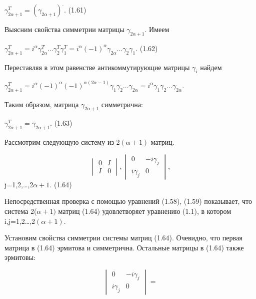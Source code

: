 \documentclass{article}
\begin{document}
{\begin{center}
$\gamma^{T}_{2\alpha+1}=(\gamma_{2\alpha+1})^{.}.$ (1.61)\par
\end{center}
Выясним свойства симметрии матрицы $\gamma_{2\alpha+1}$. Имеем\par
\begin{center}
$\gamma^{T}_{2\alpha+1}=i^{\alpha}\gamma^{T}_{2\alpha}\dots\gamma^{T}_2\gamma^{T}_1=i^{\alpha}(-1)^{\alpha}\gamma_{2\alpha}\dots\gamma_2\gamma_1.$ (1.62)\par
\end{center}
Переставляя в этом равенстве антикоммутирующие матрицы $\gamma_i$ найдем\par
\begin{center}
$\gamma^{T}_{2\alpha+1}=i^{\alpha}(-1)^{\alpha}(-1)^{\alpha(2\alpha-1)}\gamma_1\gamma_2\dots\gamma_{2\alpha}=i^{\alpha}\gamma_1\gamma_2\dots\gamma_{2\alpha}.$ \par
\end{center}
Таким образом, матрица $\gamma_{2\alpha+1}$ симметрична:\par
\begin{center}
$\gamma^{T}_{2\alpha+1}=\gamma_{2\alpha+1}.$        (1.63)\par
\end{center}
Рассмотрим следующую систему из 2$(\alpha+1)$ матриц.\par
\begin{center}
$$
\begin{vmatrix}
0 & I\\
I & 0
\end{vmatrix},
\begin{vmatrix}
0 & -i\gamma_j\\
i\gamma_j & 0
\end{vmatrix},
$$
j=1,2,\dots,2$\alpha+1$.  (1.64)\par
\end{center}
\par
Непосредственная проверка с помощью уравнений (1.58), (1.59) показывает, что система 2($\alpha+1)$ матриц (1.64) удовлетворяет уравнению (1.1), в котором i,j=1,2\dots,2$(\alpha+1)$.\par
Установим свойства симметрии системы матриц (1.64). Очевидно, что первая матрица в (1.64) эрмитова и симметрична. Остальные матрицы в (1.64) также эрмитовы:\par
$$
\begin{vmatrix}
0 & -i\gamma_j\\
i\gamma_j & 0
\end{vmatrix}=
$$}
\end{document}
